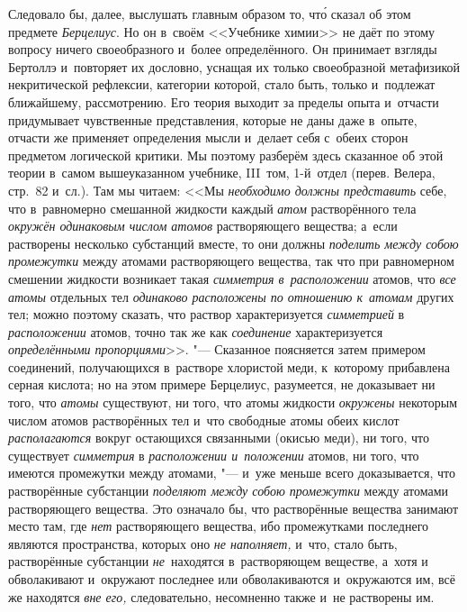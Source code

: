 Следовало бы, далее, выслушать главным образом то, чт\'{о} сказал об этом
предмете {\em Берцелиус}. Но он в~своём <<Учебнике химии>> не даёт по этому
вопросу ничего своеобразного и~более определённого. Он принимает взгляды
Бертоллэ и~повторяет их дословно, уснащая их только своеобразной метафизикой
некритической рефлексии, категории которой, стало быть, только и~подлежат
ближайшему, рассмотрению. Его теория выходит за пределы опыта и~отчасти
придумывает чувственные представления, которые не даны даже в~опыте, отчасти же
применяет определения мысли и~делает себя с~обеих сторон предметом логической
критики. Мы поэтому разберём здесь сказанное об этой теории в~самом
вышеуказанном учебнике, III~том, 1-й~отдел (перев. Велера, стр.~82 и~сл.). Там
мы читаем: <<Мы {\em необходимо должны представить} себе, что в~равномерно
смешанной жидкости каждый {\em атом} растворённого тела
{\em окружён одинаковым числом атомов} растворяющего вещества; а~если
растворены несколько субстанций вместе, то они должны {\em поделить между собою
промежутки} между атомами растворяющего вещества, так что при равномерном
смешении жидкости возникает такая {\em симметрия в~расположении} атомов, что
{\em все атомы} отдельных тел {\em одинаково расположены по отношению к~атомам}
других тел; можно поэтому сказать, что раствор характеризуется {\em симметрией}
в {\em расположении} атомов, точно так же как {\em соединение} характеризуется
{\em определёнными пропорциями}>>. "--- Сказанное поясняется затем примером
соединений, получающихся в~растворе хлористой меди, к~которому прибавлена
серная кислота; но на этом примере Берцелиус, разумеется, не доказывает ни
того, что {\em атомы} существуют, ни того, что атомы жидкости {\em окружены}
некоторым числом атомов растворённых тел и~что свободные атомы обеих кислот
{\em располагаются} вокруг остающихся связанными (окисью меди), ни того, что
существует {\em симметрия} в {\em расположении и~положении} атомов, ни того,
что имеются промежутки между атомами, "--- и~уже меньше всего доказывается, что
растворённые субстанции {\em поделяют между собою промежутки} между атомами
растворяющего вещества. Это означало бы, что растворённые вещества занимают
место там, где {\em нет} растворяющего вещества, ибо промежутками последнего
являются пространства, которых оно {\em не наполняет,} и~что, стало быть,
растворённые субстанции {\em не}~находятся в~растворяющем веществе, а~хотя и
обволакивают и~окружают последнее или обволакиваются и~окружаются им, всё же
находятся {\em вне его,} следовательно, несомненно также и~не растворены им.

